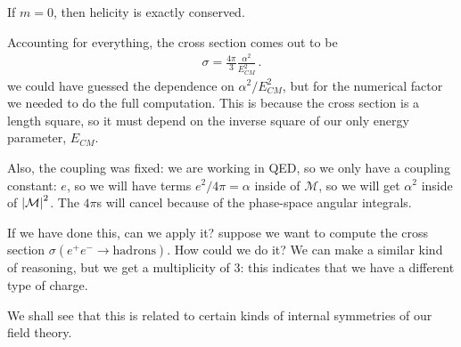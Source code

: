 \documentclass[main.tex]{subfiles}
\begin{document}
If \(m=0\), then helicity is exactly conserved. 

Accounting for everything, the cross section comes out to be 
%
\begin{align}
\sigma = \frac{4 \pi }{3} \frac{\alpha^2}{E^2_{CM}}
\,.
\end{align}
%
we could have guessed the dependence on \(\alpha^2  / E^2_{CM}\), but for the numerical factor we needed to do the full computation. 
This is because the cross section is a length square, so it must depend on the inverse square of our only energy parameter, \(E_{CM}\). 

Also, the coupling was fixed: we are working in QED, so we only have a coupling constant: \(e\), so we will have terms \(e^2 / 4 \pi = \alpha \) inside of \(\mathcal{M}\), so we will get \(\alpha^2\) inside of \(\abs{\mathcal{M}}^2\). 
The \(4 \pi \)s will cancel because of the phase-space angular integrals.

If we have done this, can we apply it? suppose we want to compute the cross section \(\sigma (e^{+}e^{-} \to \text{hadrons})\). How could we do it?
We can make a similar kind of reasoning, but we get a multiplicity of 3: this indicates that we have a different type of charge.

We shall see that this is related to certain kinds of internal symmetries of our field theory. 
\end{document}
